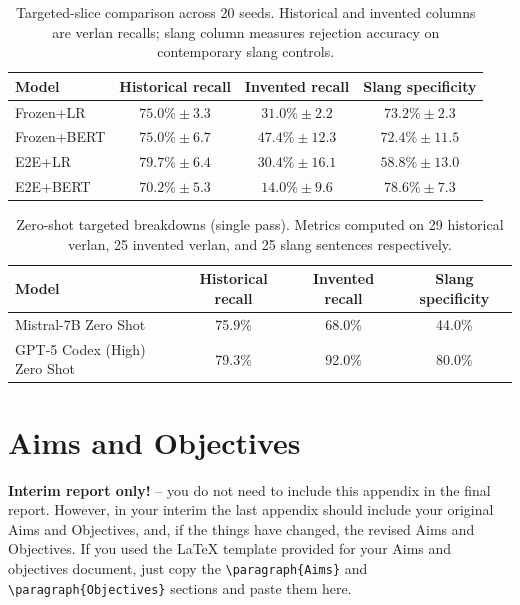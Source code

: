 \documentclass[12pt]{article}
\begin{document}
\begin{table}[H]
    \centering
    \footnotesize
    \begin{tabular}{lccc}
        \hline
        Model & Historical recall & Invented recall & Slang specificity \\
        \hline
        Frozen+LR & $75.0\%\pm3.3$ & $31.0\%\pm2.2$ & $73.2\%\pm2.3$ \\
        Frozen+BERT & $75.0\%\pm6.7$ & $47.4\%\pm12.3$ & $72.4\%\pm11.5$ \\
        E2E+LR & $79.7\%\pm6.4$ & $30.4\%\pm16.1$ & $58.8\%\pm13.0$ \\
        E2E+BERT & $70.2\%\pm5.3$ & $14.0\%\pm9.6$ & $78.6\%\pm7.3$ \\
        \hline
    \end{tabular}
    \caption{Targeted-slice comparison across 20 seeds. Historical and invented columns are verlan recalls; slang column measures rejection accuracy on contemporary slang controls.}
    \label{tab:appendix-targeted-metrics}
\end{table}

\begin{table}[H]
    \centering
    \footnotesize
    \begin{tabular}{lccc}
        \hline
        Model & Historical recall & Invented recall & Slang specificity \\
        \hline
        Mistral-7B Zero Shot & 75.9\% & 68.0\% & 44.0\% \\
        GPT-5 Codex (High) Zero Shot & 79.3\% & 92.0\% & 80.0\% \\
        \hline
    \end{tabular}
    \caption{Zero-shot targeted breakdowns (single pass). Metrics computed on 29 historical verlan, 25 invented verlan, and 25 slang sentences respectively.}
    \label{tab:appendix-zeroshot-targeted}
\end{table}


\section{Aims and Objectives}

\textbf{Interim report only!} -- you do not need to include this appendix in the final report.  However, in your interim the last appendix should include your original Aims and Objectives, and, if the things have changed, the revised Aims and Objectives. If you used the \LaTeX{} template provided for your Aims and objectives document, just copy the \verb$\paragraph{Aims}$ and \verb$\paragraph{Objectives}$ sections and paste them here.
\end{document}
